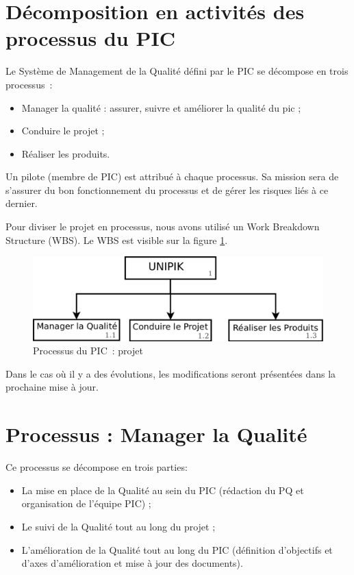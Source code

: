\section{Décomposition en activités des processus du PIC}

Le Système de Management de la Qualité défini par le PIC \nomPIC{} se décompose en trois processus~:
\begin{itemize}
 \item Manager la qualité : assurer, suivre et améliorer la qualité du pic ; 
 \item Conduire le projet ;
 \item Réaliser les produits. \\
\end{itemize}

Un pilote (membre de PIC) est attribué à chaque processus. Sa mission sera de s'assurer du bon fonctionnement du processus et de gérer les risques liés à ce dernier.

Pour diviser le projet en processus, nous avons utilisé un Work Breakdown Structure (WBS). Le WBS est visible sur la figure \ref{WBS1}.

\begin{figure}[H]
\centering
 \includegraphics[width=14cm]{images/organigrammeProcessusPic.png}
 \caption{Processus du PIC~: projet \nomEquipe{}}
 \label{WBS1}
\end{figure}

 Dans le cas où il y a des évolutions, les modifications seront présentées dans la prochaine mise à jour.
\newpage
 
\section{Processus : Manager la Qualité}
\label{ProcessusQualite}
Ce processus se décompose en trois parties:
\begin{itemize}
\item La mise en place de la Qualité au sein du PIC (rédaction du PQ et organisation de l'équipe PIC) ; 
\item Le suivi de la Qualité tout au long du projet ; 
\item L'amélioration de la Qualité tout au long du PIC (définition d'objectifs et d'axes d'amélioration et mise à jour des documents). 
\end{itemize}
